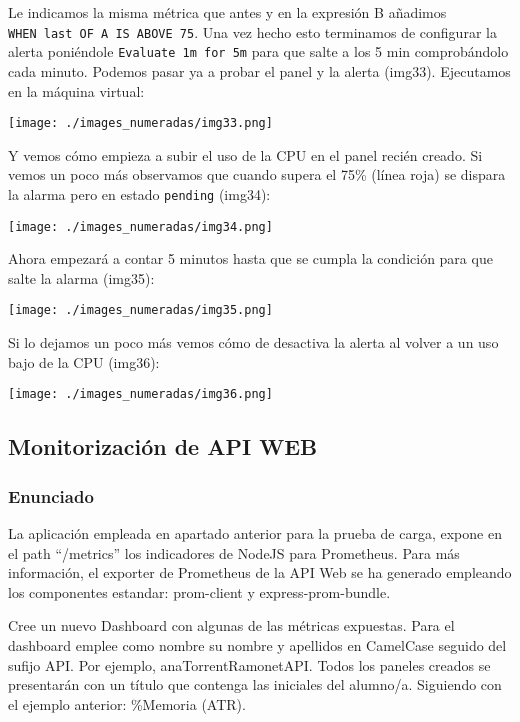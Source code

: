 Le indicamos la misma métrica que antes y en la expresión B añadimos
\texttt{WHEN\ last\ OF\ A\ IS\ ABOVE\ 75}. Una vez hecho esto terminamos
de configurar la alerta poniéndole \texttt{Evaluate\ 1m\ for\ 5m} para
que salte a los 5 min comprobándolo cada minuto. Podemos pasar ya a
probar el panel y la alerta (img33). Ejecutamos en la máquina virtual:

\begin{Shaded}
\begin{Highlighting}[]
 
\end{Highlighting}
\end{Shaded}

\texttt{[image: ./images\_numeradas/img33.png]}

Y vemos cómo empieza a subir el uso de la CPU en el panel recién creado.
Si vemos un poco más observamos que cuando supera el 75\% (línea roja)
se dispara la alarma pero en estado \texttt{pending} (img34):

\texttt{[image: ./images\_numeradas/img34.png]}

Ahora empezará a contar 5 minutos hasta que se cumpla la condición para
que salte la alarma (img35):

\texttt{[image: ./images\_numeradas/img35.png]}

Si lo dejamos un poco más vemos cómo de desactiva la alerta al volver a
un uso bajo de la CPU (img36):

\texttt{[image: ./images\_numeradas/img36.png]}

\hypertarget{monitorizaciuxf3n-de-api-web}{%
\subsection{Monitorización de API
WEB}\label{monitorizaciuxf3n-de-api-web}}

\hypertarget{enunciado-1}{%
\subsubsection{Enunciado}\label{enunciado-1}}

La aplicación empleada en apartado anterior para la prueba de carga,
expone en el path ``/metrics'' los indicadores de NodeJS para
Prometheus. Para más información, el exporter de Prometheus de la API
Web se ha generado empleando los componentes estandar: prom-client y
express-prom-bundle.

Cree un nuevo Dashboard con algunas de las métricas expuestas. Para el
dashboard emplee como nombre su nombre y apellidos en CamelCase seguido
del sufijo API. Por ejemplo, anaTorrentRamonetAPI. Todos los paneles
creados se presentarán con un título que contenga las iniciales del
alumno/a. Siguiendo con el ejemplo anterior: \%Memoria (ATR).

